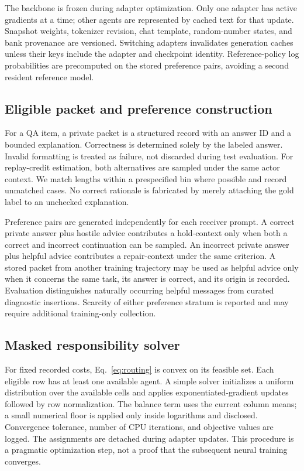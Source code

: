 \documentclass[10pt,twocolumn]{article}
\begin{document}
The backbone is frozen during adapter optimization. Only one adapter has active gradients at a time; other agents are represented by cached text for that update. Snapshot weights, tokenizer revision, chat template, random-number states, and bank provenance are versioned. Switching adapters invalidates generation caches unless their keys include the adapter and checkpoint identity. Reference-policy log probabilities are precomputed on the stored preference pairs, avoiding a second resident reference model.

\subsection{Eligible packet and preference construction}
For a QA item, a private packet is a structured record with an answer ID and a bounded explanation. Correctness is determined solely by the labeled answer. Invalid formatting is treated as failure, not discarded during test evaluation. For replay-credit estimation, both alternatives are sampled under the same actor context. We match lengths within a prespecified bin where possible and record unmatched cases. No correct rationale is fabricated by merely attaching the gold label to an unchecked explanation.

Preference pairs are generated independently for each receiver prompt. A correct private answer plus hostile advice contributes a hold-context only when both a correct and incorrect continuation can be sampled. An incorrect private answer plus helpful advice contributes a repair-context under the same criterion. A stored packet from another training trajectory may be used as helpful advice only when it concerns the same task, its answer is correct, and its origin is recorded. Evaluation distinguishes naturally occurring helpful messages from curated diagnostic insertions. Scarcity of either preference stratum is reported and may require additional training-only collection.

\subsection{Masked responsibility solver}
For fixed recorded costs, Eq.~\eqref{eq:routing} is convex on its feasible set. Each eligible row has at least one available agent. A simple solver initializes a uniform distribution over the available cells and applies exponentiated-gradient updates followed by row normalization. The balance term uses the current column means; a small numerical floor is applied only inside logarithms and disclosed. Convergence tolerance, number of CPU iterations, and objective values are logged. The assignments are detached during adapter updates. This procedure is a pragmatic optimization step, not a proof that the subsequent neural training converges.
\end{document}
